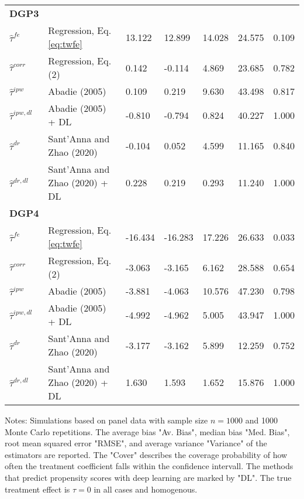 \begin{table}[htbp]
{\begin{threeparttable}
\begin{tabular}{lllllll}
\addlinespace
\large \textbf{DGP3}            &                                   &            &             &      &           \\
\addlinespace
$\hat{\tau}^{fe}$ & Regression, Eq. \eqref{eq:twfe}               & 13.122       & 12.899       & 14.028 & 24.575 & 0.109    \\
$\hat{\tau}^{corr}$ & Regression, Eq. (2)             & 0.142       & -0.114       & 4.869 & 23.685 &0.782   \\
$\hat{\tau}^{ipw}$ & Abadie (2005)                    & 0.109     & 0.219      & 9.630 & 43.498  & 0.817   \\
$\hat{\tau}^{ipw,dl}$ & Abadie (2005) + DL            & -0.810       & -0.794        & 0.824 & 40.227  &   1.000  \\
$\hat{\tau}^{dr}$ & Sant'Anna and Zhao (2020)         & -0.104       & 0.052        & 4.599 & 11.165  &0.840    \\
$\hat{\tau}^{dr,dl}$ & Sant'Anna and Zhao (2020) + DL & 0.228       & 0.219        & 0.293 & 11.240   &1.000   \\  \midrule


\addlinespace
\large \textbf{DGP4}            &                                   &            &             &      &           \\
\addlinespace
$\hat{\tau}^{fe}$ & Regression, Eq. \eqref{eq:twfe}              & -16.434       & -16.283        & 17.226 & 26.633  & 0.033   \\
$\hat{\tau}^{corr}$ & Regression, Eq. (2)             & -3.063       & -3.165       & 6.162 & 28.588  &0.654   \\
$\hat{\tau}^{ipw}$ & Abadie (2005)                    & -3.881       & -4.063        & 10.576 & 47.230    & 0.798  \\
$\hat{\tau}^{ipw,dl}$ & Abadie (2005) + DL            & -4.992       & -4.962        & 5.005 & 43.947 & 1.000     \\
$\hat{\tau}^{dr}$ & Sant'Anna and Zhao (2020)         &-3.177      &-3.162       & 5.899 & 12.259  &0.752    \\
$\hat{\tau}^{dr,dl}$ & Sant'Anna and Zhao (2020) + DL & 1.630       & 1.593        & 1.652 & 15.876  &1.000    \\


\bottomrule
\end{tabular}
\vspace{1em}
\begin{tablenotes}
\item Notes: Simulations based on panel data with sample size $n = 1000$ and 1000 Monte Carlo repetitions. The average bias "Av. Bias", median bias "Med. Bias", root mean squared error "RMSE", and average variance "Variance" of the estimators are reported. The "Cover" describes the coverage probability of how often the treatment coefficient falls within the confidence intervall. The methods that predict propensity scores with deep learning are marked by "DL". The true treatment effect is $\tau = 0$ in all cases and homogenous.
\end{tablenotes}
\end{threeparttable}}
\end{table}
